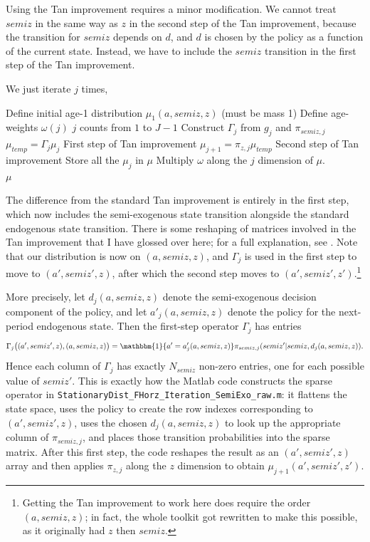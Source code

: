 Using the Tan improvement requires a minor modification. We cannot treat $semiz$ in the same way as $z$ in the second step of the Tan improvement, because the transition for $semiz$ depends on $d$, and $d$ is chosen by the policy as a function of the current state. Instead, we have to include the $semiz$ transition in the first step of the Tan improvement.

We just iterate $j$ times,
\begin{algorithmic}
 \State Define initial age-1 distribution $\mu_1(a,semiz,z)$ (must be mass 1)
 \State Define age-weights $\omega(j)$
 \For $j$ counts from $1$ to $J-1$
  \State Construct $\Gamma_j$ from $g_j$ and $\pi_{semiz,j}$
  \State $\mu_{temp}=\Gamma_j \mu_j$ \Comment First step of Tan improvement
  \State $\mu_{j+1}=\pi_{z,j} \mu_{temp}$ \Comment Second step of Tan improvement
 \EndFor
 \State Store all the $\mu_j$ in $\mu$
  \State Multiply $\omega$ along the $j$ dimension of $\mu$.
 \\ \Return $\mu$
 \end{algorithmic}
The difference from the standard Tan improvement is entirely in the first step, which now includes the semi-exogenous state transition alongside the standard endogenous state transition.
There is some reshaping of matrices involved in the Tan improvement that I have glossed over here; for a full explanation, see \cite{Tan2020}. Note that our distribution is now on $(a,semiz,z)$, and $\Gamma_j$ is used in the first step to move to $(a',semiz',z)$, after which the second step moves to $(a',semiz',z')$.\footnote{Getting the Tan improvement to work here does require the order $(a,semiz,z)$; in fact, the whole toolkit got rewritten to make this possible, as it originally had $z$ then $semiz$.}

More precisely, let $d_j(a,semiz,z)$ denote the semi-exogenous decision component of the policy, and let $a'_j(a,semiz,z)$ denote the policy for the next-period endogenous state. Then the first-step operator $\Gamma_j$ has entries
\[
\Gamma_j\big((a',semiz',z),(a,semiz,z)\big)
=\mathbbm{1}\{a'=a'_j(a,semiz,z)\}\pi_{semiz,j}(semiz'|semiz,d_j(a,semiz,z)).
\]
Hence each column of $\Gamma_j$ has exactly $N_{semiz}$ non-zero entries, one for each possible value of $semiz'$. This is exactly how the Matlab code constructs the sparse operator in \texttt{StationaryDist\_FHorz\_Iteration\_SemiExo\_raw.m}: it flattens the state space, uses the policy to create the row indexes corresponding to $(a',semiz',z)$, uses the chosen $d_j(a,semiz,z)$ to look up the appropriate column of $\pi_{semiz,j}$, and places those transition probabilities into the sparse matrix. After this first step, the code reshapes the result as an $(a',semiz',z)$ array and then applies $\pi_{z,j}$ along the $z$ dimension to obtain $\mu_{j+1}(a',semiz',z')$.

